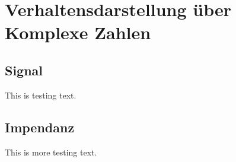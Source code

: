 \section{Verhaltensdarstellung über Komplexe Zahlen}
\subsection{Signal}
This is testing text. 

\subsection{Impendanz}
This is more testing text.
